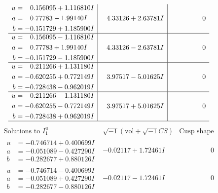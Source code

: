 \documentclass[1p]{elsarticle_modified}
\theoremstyle{definition}
\newcommand{\I}{\sqrt{-1}}
\begin{document}
$$\begin{array}{c|c|c}
\begin{aligned}
u &= \phantom{-}0.156095 + 1.116810 I \\
a &= \phantom{-}0.77783 - 1.99140 I \\
b &= -0.151729 + 1.185900 I\end{aligned}
 & \phantom{-}4.33126 + 2.63781 I & \phantom{-0.000000 } 0 \\ \hline\begin{aligned}
u &= \phantom{-}0.156095 - 1.116810 I \\
a &= \phantom{-}0.77783 + 1.99140 I \\
b &= -0.151729 - 1.185900 I\end{aligned}
 & \phantom{-}4.33126 - 2.63781 I & \phantom{-0.000000 } 0 \\ \hline\begin{aligned}
u &= \phantom{-}0.211266 + 1.131180 I \\
a &= -0.620255 + 0.772149 I \\
b &= -0.728438 - 0.962019 I\end{aligned}
 & \phantom{-}3.97517 - 5.01625 I & \phantom{-0.000000 } 0 \\ \hline\begin{aligned}
u &= \phantom{-}0.211266 - 1.131180 I \\
a &= -0.620255 - 0.772149 I \\
b &= -0.728438 + 0.962019 I\end{aligned}
 & \phantom{-}3.97517 + 5.01625 I & \phantom{-0.000000 } 0\\
 \hline 
 \end{array}$$\newpage$$\begin{array}{c|c|c}  
\text{Solutions to }I^u_{1}& \I (\text{vol} + \sqrt{-1}CS) & \text{Cusp shape}\\
 \hline 
\begin{aligned}
u &= -0.746714 + 0.400699 I \\
a &= -0.051089 - 0.427290 I \\
b &= -0.282677 + 0.880126 I\end{aligned}
 & -0.02117 + 1.72461 I & \phantom{-0.000000 } 0 \\ \hline\begin{aligned}
u &= -0.746714 - 0.400699 I \\
a &= -0.051089 + 0.427290 I \\
b &= -0.282677 - 0.880126 I\end{aligned}
 & -0.02117 - 1.72461 I & \phantom{-0.000000 } 0 \\ \hline\begin{aligned}

\end{aligned}
\end{array}$$
\end{document}
